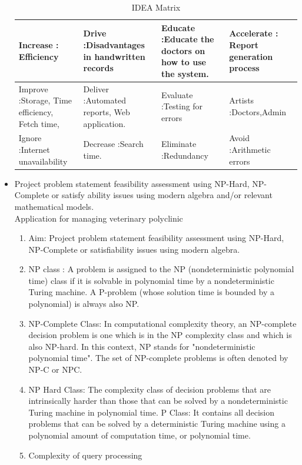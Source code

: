 \documentclass[oneside,a4paper,12pt]{book}
\begin{document}
\begin{appendices}
\begin{itemize}
\begin{table}[!htbp]
\begin{center}
\begin{tabular}{|p{3cm}| p{3cm}|p{3cm}|p{3cm}|}
Increase : Efficiency & Drive :Disadvantages in handwritten records & Educate :Educate the doctors on how to use the system. & Accelerate : Report generation process\\
 
\hline
Improve :Storage,
Time efficiency,
Fetch time,
 & Deliver :Automated reports,
Web application.
 & Evaluate :Testing for errors& Artists :Doctors,Admin \\
 \hline
Ignore :Internet unavailability & Decrease :Search time.& Eliminate :Redundancy & Avoid :Arithmetic errors\\
\hline
\end{tabular}
 \caption { IDEA Matrix }
 \label{tab:imatrix}
\end{center}
\end{table}

\item Project problem statement feasibility assessment using NP-Hard, NP-Complete or satisfy ability issues using modern algebra and/or relevant mathematical models. \\ 



Application for managing veterinary polyclinic

\begin{enumerate}
\item Aim: Project problem statement feasibility assessment using NP-Hard, NP-Complete or satisfiability issues using modern algebra.
\item NP class : A problem is assigned to the NP (nondeterministic polynomial time) class if it is solvable in polynomial time by a nondeterministic Turing machine. A P-problem (whose solution time is bounded by a polynomial) is always also NP.
\item NP-Complete Class: In computational complexity theory, an NP-complete decision problem is one which is in the NP complexity class and which is also NP-hard. In this context, NP stands for "nondeterministic polynomial time". The set of NP-complete problems is often denoted by NP-C or NPC.
\item NP Hard Class: The complexity class of decision problems that are intrinsically harder than those that can be solved by a nondeterministic Turing machine in polynomial time. P Class: It contains all decision problems that can be solved by a deterministic Turing machine using a polynomial amount of computation time, or polynomial time.
\item Complexity of query processing


\end{enumerate}
\end{itemize}
\end{appendices}
\end{document}
